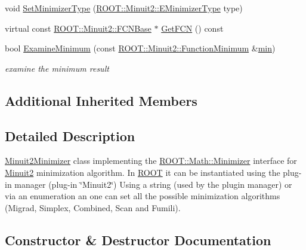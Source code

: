 \begin{DoxyCompactItemize}
\item 
void \mbox{\hyperlink{classROOT_1_1Minuit2_1_1Minuit2Minimizer_a9f1b93afd722023e5c879453e65f1041}{Set\+Minimizer\+Type}} (\mbox{\hyperlink{namespaceROOT_1_1Minuit2_abdfae3dff24b1dc5a23955c06fe2a8d6}{R\+O\+O\+T\+::\+Minuit2\+::\+E\+Minimizer\+Type}} type)
\item 
virtual const \mbox{\hyperlink{classROOT_1_1Minuit2_1_1FCNBase}{R\+O\+O\+T\+::\+Minuit2\+::\+F\+C\+N\+Base}} $\ast$ \mbox{\hyperlink{classROOT_1_1Minuit2_1_1Minuit2Minimizer_aee4d274acbb0db4702010a62ebdd4d56}{Get\+F\+CN}} () const
\item 
bool \mbox{\hyperlink{classROOT_1_1Minuit2_1_1Minuit2Minimizer_a004057cf512dcbd986799fabe756cecc}{Examine\+Minimum}} (const \mbox{\hyperlink{classROOT_1_1Minuit2_1_1FunctionMinimum}{R\+O\+O\+T\+::\+Minuit2\+::\+Function\+Minimum}} \&\mbox{\hyperlink{SU3__internal_8h_ab0f5fed3171eb00d1c5f037d9f518a23}{min}})
\begin{DoxyCompactList}\small\item\em examine the minimum result \end{DoxyCompactList}\end{DoxyCompactItemize}
\subsection*{Additional Inherited Members}


\subsection{Detailed Description}
\mbox{\hyperlink{classROOT_1_1Minuit2_1_1Minuit2Minimizer}{Minuit2\+Minimizer}} class implementing the \mbox{\hyperlink{classROOT_1_1Math_1_1Minimizer}{R\+O\+O\+T\+::\+Math\+::\+Minimizer}} interface for \mbox{\hyperlink{namespaceROOT_1_1Minuit2}{Minuit2}} minimization algorithm. In \mbox{\hyperlink{namespaceROOT}{R\+O\+OT}} it can be instantiated using the plug-\/in manager (plug-\/in \char`\"{}\+Minuit2\char`\"{}) Using a string (used by the plugin manager) or via an enumeration an one can set all the possible minimization algorithms (Migrad, Simplex, Combined, Scan and Fumili). 

\subsection{Constructor \& Destructor Documentation}
\mbox{\label{classROOT_1_1Minuit2_1_1Minuit2Minimizer_a0b75191bcd9e23e8dd5fbe6629c01704}} 
